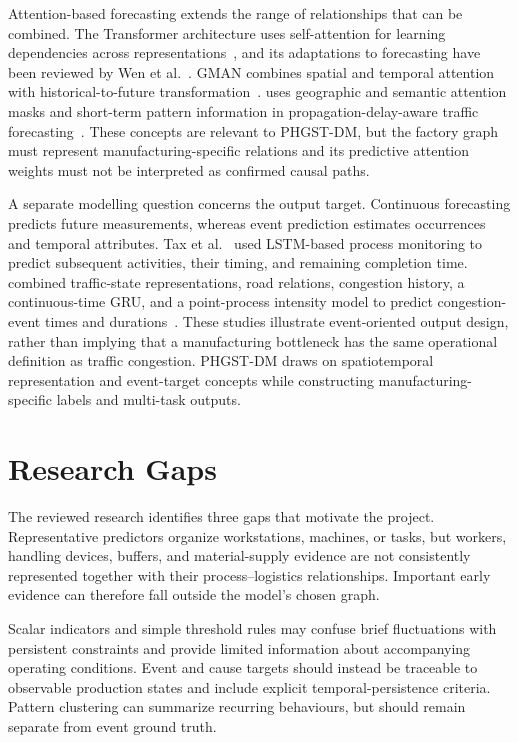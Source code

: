 Attention-based forecasting extends the range of relationships that can be combined. The Transformer architecture uses self-attention for learning dependencies across representations~\cite{vaswani2017attention}, and its adaptations to forecasting have been reviewed by Wen et al.~\cite{wen2023transformers}. GMAN combines spatial and temporal attention with historical-to-future transformation~\cite{zheng2020gman}.  uses geographic and semantic attention masks and short-term pattern information in propagation-delay-aware traffic forecasting~\cite{jiang2023pdformer}. These concepts are relevant to PHGST-DM, but the factory graph must represent manufacturing-specific relations and its predictive attention weights must not be interpreted as confirmed causal paths.

A separate modelling question concerns the output target. Continuous forecasting predicts future measurements, whereas event prediction estimates occurrences and temporal attributes. Tax et al.~\cite{tax2017predictive} used LSTM-based process monitoring to predict subsequent activities, their timing, and remaining completion time.  combined traffic-state representations, road relations, congestion history, a continuous-time GRU, and a point-process intensity model to predict congestion-event times and durations~\cite{jin2023stgnpp}. These studies illustrate event-oriented output design, rather than implying that a manufacturing bottleneck has the same operational definition as traffic congestion. PHGST-DM draws on spatiotemporal representation and event-target concepts while constructing manufacturing-specific labels and multi-task outputs.

\section{Research Gaps}\label{research-gaps}

The reviewed research identifies three gaps that motivate the project.  Representative predictors organize workstations, machines, or tasks, but workers, handling devices, buffers, and material-supply evidence are not consistently represented together with their process--logistics relationships. Important early evidence can therefore fall outside the model's chosen graph.

 Scalar indicators and simple threshold rules may confuse brief fluctuations with persistent constraints and provide limited information about accompanying operating conditions. Event and cause targets should instead be traceable to observable production states and include explicit temporal-persistence criteria. Pattern clustering can summarize recurring behaviours, but should remain separate from event ground truth.

